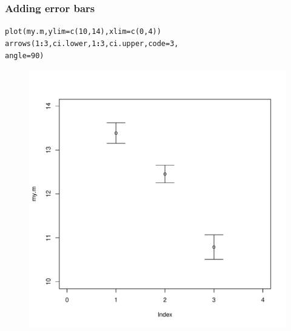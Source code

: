 \documentclass{beamer}\usepackage[]{graphicx}\usepackage[]{color}
\makeatletter
\newcommand{\hlnum}[1]{\textcolor[rgb]{0.533,0,0.133}{#1}}%
\newcommand{\hlopt}[1]{\textcolor[rgb]{0,0,0}{\textbf{#1}}}%
\newcommand{\hlstd}[1]{\textcolor[rgb]{0,0,0}{#1}}%
\newcommand{\hlkwc}[1]{\textcolor[rgb]{0,0,0.4}{#1}}%
\newcommand{\hlkwd}[1]{\textcolor[rgb]{0,0.267,0.4}{#1}}%
\newenvironment{kframe}{%
 \def\at@end@of@kframe{}%
 \ifinner\ifhmode%
  \def\at@end@of@kframe{\end{minipage}}%
  \begin{minipage}{\columnwidth}%
 \fi\fi%
 \def\FrameCommand##1{\hskip\@totalleftmargin \hskip-\fboxsep
 \colorbox{shadecolor}{##1}\hskip-\fboxsep
     \hskip-\linewidth \hskip-\@totalleftmargin \hskip\columnwidth}%
 \MakeFramed {\advance\hsize-\width
   \@totalleftmargin\z@ \linewidth\hsize
   \@setminipage}}%
 {\par\unskip\endMakeFramed%
 \at@end@of@kframe}
\newenvironment{knitrout}{}{} %
\makeatother
\begin{document}
\begin{frame}[fragile]
  \frametitle{Adding error bars}
\begin{knitrout}
\color{fgcolor}\begin{kframe}
\begin{alltt}
\hlkwd{plot}\hlstd{(my.m,} \hlkwc{ylim} \hlstd{=} \hlkwd{c}\hlstd{(}\hlnum{10}\hlstd{,} \hlnum{14}\hlstd{),} \hlkwc{xlim} \hlstd{=} \hlkwd{c}\hlstd{(}\hlnum{0}\hlstd{,} \hlnum{4}\hlstd{))}
\hlkwd{arrows}\hlstd{(}\hlnum{1}\hlopt{:}\hlnum{3}\hlstd{, ci.lower,} \hlnum{1}\hlopt{:}\hlnum{3}\hlstd{, ci.upper,} \hlkwc{code} \hlstd{=} \hlnum{3}\hlstd{,}
       \hlkwc{angle} \hlstd{=} \hlnum{90}\hlstd{)}
\end{alltt}
\end{kframe}
\end{knitrout}

\begin{figure}[h]
  \vspace{-20pt}
  \centering
  \includegraphics[height = 0.65\textwidth, keepaspectratio]{Figure/m3}
  \label{fig:m3}
\end{figure}
\end{frame} 
\end{document}
